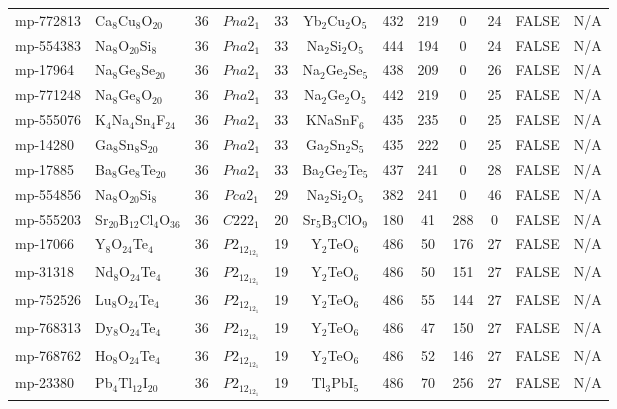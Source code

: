{\begin{longtable}{llcccccccccc}
    mp-772813 & Ca$_{8}$Cu$_{8}$O$_{20}$ & 36    & $Pna2_1$ & 33    & Yb$_{2}$Cu$_{2}$O$_{5}$ & 432   & 219   & 0     & 24    & FALSE & N/A \\
    mp-554383 & Na$_{8}$O$_{20}$Si$_{8}$ & 36    & $Pna2_1$ & 33    & Na$_{2}$Si$_{2}$O$_{5}$ & 444   & 194   & 0     & 24    & FALSE & N/A \\
    mp-17964 & Na$_{8}$Ge$_{8}$Se$_{20}$ & 36    & $Pna2_1$ & 33    & Na$_{2}$Ge$_{2}$Se$_{5}$ & 438   & 209   & 0     & 26    & FALSE & N/A \\
    mp-771248 & Na$_{8}$Ge$_{8}$O$_{20}$ & 36    & $Pna2_1$ & 33    & Na$_{2}$Ge$_{2}$O$_{5}$ & 442   & 219   & 0     & 25    & FALSE & N/A \\
    mp-555076 & K$_{4}$Na$_{4}$Sn$_{4}$F$_{24}$ & 36    & $Pna2_1$ & 33    & KNaSnF$_{6}$ & 435   & 235   & 0     & 25    & FALSE & N/A \\
    mp-14280 & Ga$_{8}$Sn$_{8}$S$_{20}$ & 36    & $Pna2_1$ & 33    & Ga$_{2}$Sn$_{2}$S$_{5}$ & 435   & 222   & 0     & 25    & FALSE & N/A \\
    mp-17885 & Ba$_{8}$Ge$_{8}$Te$_{20}$ & 36    & $Pna2_1$ & 33    & Ba$_{2}$Ge$_{2}$Te$_{5}$ & 437   & 241   & 0     & 28    & FALSE & N/A \\
    mp-554856 & Na$_{8}$O$_{20}$Si$_{8}$ & 36    & $Pca2_1$ & 29    & Na$_{2}$Si$_{2}$O$_{5}$ & 382   & 241   & 0     & 46    & FALSE & N/A \\
    mp-555203 & Sr$_{20}$B$_{12}$Cl$_{4}$O$_{36}$ & 36    & $C222_1$ & 20    & Sr$_{5}$B$_{3}$ClO$_{9}$ & 180   & 41    & 288   & 0     & FALSE & N/A \\
    mp-17066 & Y$_{8}$O$_{24}$Te$_{4}$ & 36    & $P2_12_12_1$ & 19    & Y$_{2}$TeO$_{6}$ & 486   & 50    & 176   & 27    & FALSE & N/A \\
    mp-31318 & Nd$_{8}$O$_{24}$Te$_{4}$ & 36    & $P2_12_12_1$ & 19    & Y$_{2}$TeO$_{6}$ & 486   & 50    & 151   & 27    & FALSE & N/A \\
    mp-752526 & Lu$_{8}$O$_{24}$Te$_{4}$ & 36    & $P2_12_12_1$ & 19    & Y$_{2}$TeO$_{6}$ & 486   & 55    & 144   & 27    & FALSE & N/A \\
    mp-768313 & Dy$_{8}$O$_{24}$Te$_{4}$ & 36    & $P2_12_12_1$ & 19    & Y$_{2}$TeO$_{6}$ & 486   & 47    & 150   & 27    & FALSE & N/A \\
    mp-768762 & Ho$_{8}$O$_{24}$Te$_{4}$ & 36    & $P2_12_12_1$ & 19    & Y$_{2}$TeO$_{6}$ & 486   & 52    & 146   & 27    & FALSE & N/A \\
    mp-23380 & Pb$_{4}$Tl$_{12}$I$_{20}$ & 36    & $P2_12_12_1$ & 19    & Tl$_{3}$PbI$_{5}$ & 486   & 70    & 256   & 27    & FALSE & N/A \\

\end{longtable}}
